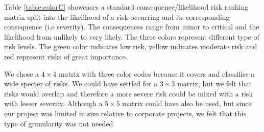 \begin{table}[h]
\caption{Consequence and likelihood color coding risk matrix.}
\label{table:colorC}
\end{table}

Table \ref{table:colorC} showcases a standard consequence/likelihood risk ranking matrix split into the likelihood of a risk occurring and its corresponding consequence (i.e severity). The consequences range from minor to critical and the likelihood from unlikely to very likely. The three colors represent different type of risk levels. The green color indicates low risk, yellow indicates moderate risk and red represent risks of great importance. 

We chose a $4\times4$ matrix with three color codes because it covers and classifies a wide specter of risks. We could have settled for a $3\times3$ matrix, but we felt that risks would overlap and therefore a more severe risk could be mixed with a risk with lesser severity. Although a $5\times5$ matrix could have also be used, but since our project was limited in size relative to corporate projects, we felt that this type of granularity was not needed. 

